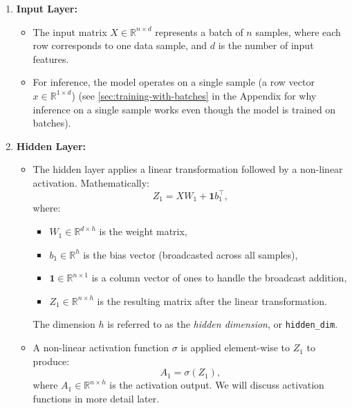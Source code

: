 \begin{enumerate}
    \item \textbf{Input Layer:}
    \begin{itemize}
        \item The input matrix \( X \in \mathbb{R}^{n \times d} \) represents a batch of \( n \) samples, where each row corresponds to one data sample, and \( d \) is the number of input features.
        \item For inference, the model operates on a single sample (a row vector \( x \in \mathbb{R}^{1 \times d} \)) (see \ref{sec:training-with-batches} in the Appendix for why inference on a single sample works even though the model is trained on batches).
    \end{itemize}

    \item \textbf{Hidden Layer:}
    \begin{itemize}
        \item The hidden layer applies a linear transformation followed by a non-linear activation. Mathematically:
        \[
        Z_1 = X W_1 + \mathbf{1} b_1^\top,
        \]
        where:
        \begin{itemize}
            \item \( W_1 \in \mathbb{R}^{d \times h} \) is the weight matrix,
            \item \( b_1 \in \mathbb{R}^{h} \) is the bias vector (broadcasted across all samples),
            \item \( \mathbf{1} \in \mathbb{R}^{n \times 1} \) is a column vector of ones to handle the broadcast addition,
            \item \( Z_1 \in \mathbb{R}^{n \times h} \) is the resulting matrix after the linear transformation.
        \end{itemize}
        The dimension $h$ is referred to as the \emph{hidden dimension}, or \texttt{hidden\_dim}.
        \item A non-linear activation function \( \sigma \) is applied element-wise to \( Z_1 \) to produce:
        \[
        A_1 = \sigma(Z_1),
        \]
        where \( A_1 \in \mathbb{R}^{n \times h} \) is the activation output. We will discuss activation functions in more detail later.
    \end{itemize}


\end{enumerate}

